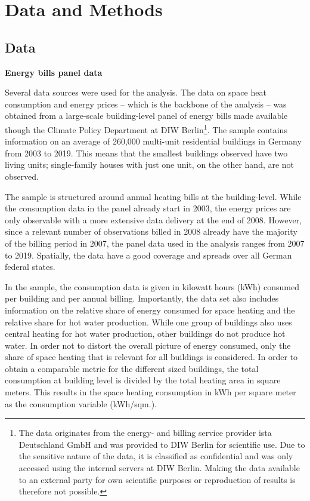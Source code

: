 \documentclass[12pt,twoside]{reedthesis}
\begin{document}
\hypertarget{methods}{%
\chapter{Data and Methods}\label{methods}}

\hypertarget{data}{%
\section{Data}\label{data}}

\textbf{Energy bills panel data}

Several data sources were used for the analysis. The data on space heat consumption and energy prices -- which is the backbone of the analysis -- was obtained from a large-scale building-level panel of energy bills made available though the Climate Policy Department at DIW Berlin\footnote{The data originates from the energy- and billing service provider ista Deutschland GmbH and was provided to DIW Berlin for scientific use. Due to the sensitive nature of the data, it is classified as confidential and was only accessed using the internal servers at DIW Berlin. Making the data available to an external party for own scientific purposes or reproduction of results is therefore not possible.}. The sample contains information on an average of 260,000 multi-unit residential buildings in Germany from 2003 to 2019. This means that the smallest buildings observed have two living units; single-family houses with just one unit, on the other hand, are not observed.

The sample is structured around annual heating bills at the building-level. While the consumption data in the panel already start in 2003, the energy prices are only observable with a more extensive data delivery at the end of 2008. However, since a relevant number of observations billed in 2008 already have the majority of the billing period in 2007, the panel data used in the analysis ranges from 2007 to 2019. Spatially, the data have a good coverage and spreads over all German federal states.

In the sample, the consumption data is given in kilowatt hours (kWh) consumed per building and per annual billing. Importantly, the data set also includes information on the relative share of energy consumed for space heating and the relative share for hot water production. While one group of buildings also uses central heating for hot water production, other buildings do not produce hot water. In order not to distort the overall picture of energy consumed, only the share of space heating that is relevant for all buildings is considered. In order to obtain a comparable metric for the different sized buildings, the total consumption at building level is divided by the total heating area in square meters. This results in the space heating consumption in kWh per square meter as the consumption variable (kWh/sqm.).
\end{document}
